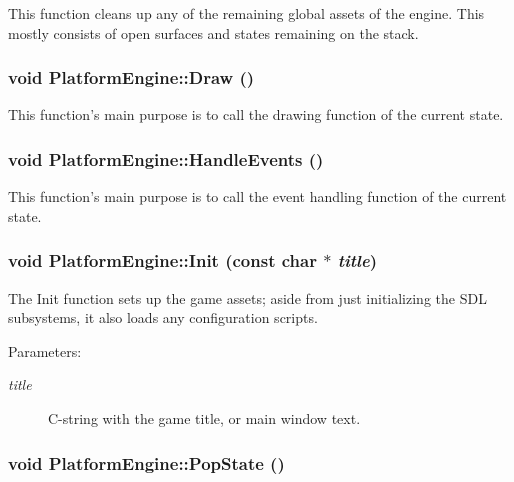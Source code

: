 This function cleans up any of the remaining global assets of the engine. This mostly consists of open surfaces and states remaining on the stack. \hypertarget{class_platform_engine_cd756d58f81c5e28efe98ae075367a5c}{
\subsubsection[{Draw}]{\setlength{\rightskip}{0pt plus 5cm}void PlatformEngine::Draw ()}}
\label{class_platform_engine_cd756d58f81c5e28efe98ae075367a5c}


This function's main purpose is to call the drawing function of the current state. \hypertarget{class_platform_engine_7fc47bff353292f1a1435d78664df36d}{
\subsubsection[{HandleEvents}]{\setlength{\rightskip}{0pt plus 5cm}void PlatformEngine::HandleEvents ()}}
\label{class_platform_engine_7fc47bff353292f1a1435d78664df36d}


This function's main purpose is to call the event handling function of the current state. \hypertarget{class_platform_engine_31d40c1f435565850964c6e9f212baa5}{
\subsubsection[{Init}]{\setlength{\rightskip}{0pt plus 5cm}void PlatformEngine::Init (const char $\ast$ {\em title})}}
\label{class_platform_engine_31d40c1f435565850964c6e9f212baa5}


The Init function sets up the game assets; aside from just initializing the SDL subsystems, it also loads any configuration scripts.

\begin{Desc}
\item[Parameters:]
\begin{description}
\item[{\em title}]C-string with the game title, or main window text. \end{description}
\end{Desc}
\hypertarget{class_platform_engine_cf001abec596906465197d1220db2230}{
\subsubsection[{PopState}]{\setlength{\rightskip}{0pt plus 5cm}void PlatformEngine::PopState ()}}
\label{class_platform_engine_cf001abec596906465197d1220db2230}


